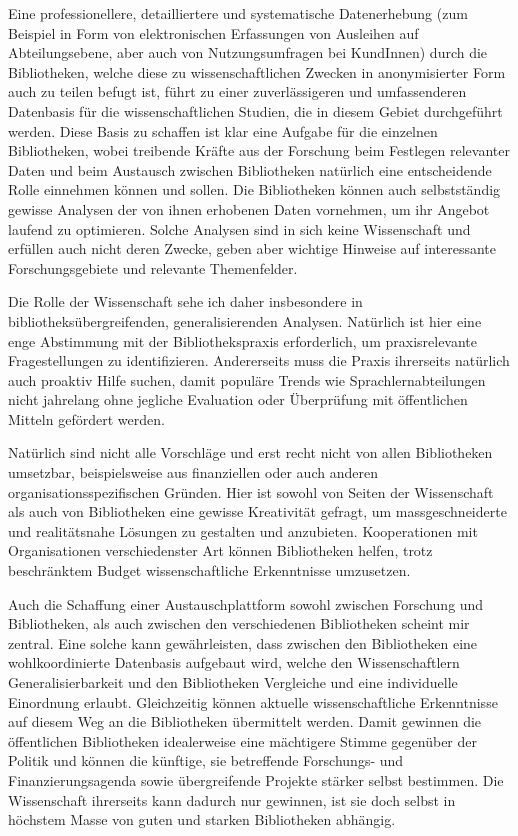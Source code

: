 \documentclass[a4paper,
fontsize=11pt,
oneside,
numbers=noperiodatend,
parskip=half-,
bibliography=totoc,
final
]{scrartcl}
\begin{document}
Eine professionellere, detailliertere und systematische Datenerhebung
(zum Beispiel in Form von elektronischen Erfassungen von Ausleihen auf
Abteilungsebene, aber auch von Nutzungsumfragen bei KundInnen) durch die
Bibliotheken, welche diese zu wissenschaftlichen Zwecken in
anonymisierter Form auch zu teilen befugt ist, führt zu einer
zuverlässigeren und umfassenderen Datenbasis für die wissenschaftlichen
Studien, die in diesem Gebiet durchgeführt werden. Diese Basis zu
schaffen ist klar eine Aufgabe für die einzelnen Bibliotheken, wobei
treibende Kräfte aus der Forschung beim Festlegen relevanter Daten und
beim Austausch zwischen Bibliotheken natürlich eine entscheidende Rolle
einnehmen können und sollen. Die Bibliotheken können auch selbstständig
gewisse Analysen der von ihnen erhobenen Daten vornehmen, um ihr Angebot
laufend zu optimieren. Solche Analysen sind in sich keine Wissenschaft
und erfüllen auch nicht deren Zwecke, geben aber wichtige Hinweise auf
interessante Forschungsgebiete und relevante Themenfelder.

Die Rolle der Wissenschaft sehe ich daher insbesondere in
bibliotheksübergreifenden, generalisierenden Analysen. Natürlich ist
hier eine enge Abstimmung mit der Bibliothekspraxis erforderlich, um
praxisrelevante Fragestellungen zu identifizieren. Andererseits muss die
Praxis ihrerseits natürlich auch proaktiv Hilfe suchen, damit populäre
Trends wie Sprachlernabteilungen nicht jahrelang ohne jegliche
Evaluation oder Überprüfung mit öffentlichen Mitteln gefördert werden.

Natürlich sind nicht alle Vorschläge und erst recht nicht von allen
Bibliotheken umsetzbar, beispielsweise aus finanziellen oder auch
anderen organisationsspezifischen Gründen. Hier ist sowohl von Seiten
der Wissenschaft als auch von Bibliotheken eine gewisse Kreativität
gefragt, um massgeschneiderte und realitätsnahe Lösungen zu gestalten
und anzubieten. Kooperationen mit Organisationen verschiedenster Art
können Bibliotheken helfen, trotz beschränktem Budget wissenschaftliche
Erkenntnisse umzusetzen.

Auch die Schaffung einer Austauschplattform sowohl zwischen Forschung
und Bibliotheken, als auch zwischen den verschiedenen Bibliotheken
scheint mir zentral. Eine solche kann gewährleisten, dass zwischen den
Bibliotheken eine wohlkoordinierte Datenbasis aufgebaut wird, welche den
Wissenschaftlern Generalisierbarkeit und den Bibliotheken Vergleiche und
eine individuelle Einordnung erlaubt. Gleichzeitig können aktuelle
wissenschaftliche Erkenntnisse auf diesem Weg an die Bibliotheken
übermittelt werden. Damit gewinnen die öffentlichen Bibliotheken
idealerweise eine mächtigere Stimme gegenüber der Politik und können die
künftige, sie betreffende Forschungs- und Finanzierungsagenda sowie
übergreifende Projekte stärker selbst bestimmen. Die Wissenschaft
ihrerseits kann dadurch nur gewinnen, ist sie doch selbst in höchstem
Masse von guten und starken Bibliotheken abhängig.
\end{document}
